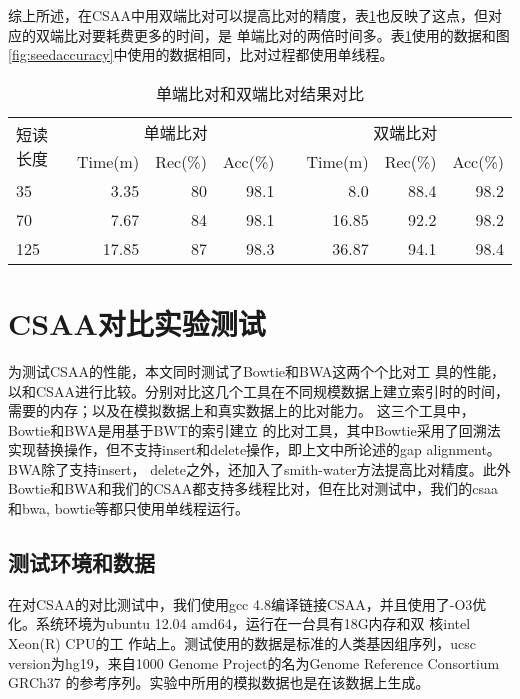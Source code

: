 综上所述，在CSAA中用双端比对可以提高比对的精度，表\ref{tab:alignmentaccuracy}也反映了这点，但对应的双端比对要耗费更多的时间，是
单端比对的两倍时间多。表\ref{tab:alignmentaccuracy}使用的数据和图\ref{fig:seedaccuracy}中使用的数据相同，比对过程都使用单线程。

\begin{table}[htbp]
    \caption{单端比对和双端比对结果对比}
    \label{tab:alignmentaccuracy}
    \centering
    \begin{tabular}{lrrrp{2ex}rrr}
        \toprule
        \multirow{2}{*}{短读长度} & \multicolumn{3}{c}{单端比对}& & \multicolumn{3}{c}{双端比对}\\
        \cline{2-4}
        \cline{6-8}
        &Time(m) &Rec(\%) &Acc(\%)& &Time(m) &Rec(\%) &Acc(\%)\\
        \midrule
        35 &3.35 &80 &98.1& &8.0 &88.4 &98.2 \\
        70 &7.67 &84 &98.1& &16.85 &92.2 &98.2 \\
        125 &17.85 &87 &98.3& &36.87 &94.1 &98.4 \\
        \bottomrule
    \end{tabular}
\end{table}



\section{CSAA对比实验测试}

为测试CSAA的性能，本文同时测试了Bowtie\cite{langmead2009ultrafast}和BWA\cite{li2009fast}这两个个比对工
具的性能，以和CSAA进行比较。分别对比这几个工具在不同规模数据上建立索引时的时间，需要的内存；以及在模拟数据上和真实数据上的比对能力。
这三个工具中，Bowtie和BWA是用基于BWT的索引建立
的比对工具，其中Bowtie采用了回溯法实现替换操作，但不支持insert和delete操作，即上文中所论述的gap alignment。BWA除了支持insert，
delete之外，还加入了smith-water方法提高比对精度。此外Bowtie和BWA和我们的CSAA都支持多线程比对，但在比对测试中，我们的csaa和bwa,
bowtie等都只使用单线程运行。

\subsection{测试环境和数据}

在对CSAA的对比测试中，我们使用gcc 4.8编译链接CSAA，并且使用了-O3优化。系统环境为ubuntu 12.04 amd64，运行在一台具有18G内存和双
核intel Xeon(R) CPU的工
作站上。测试使用的数据是标准的人类基因组序列，ucsc version为hg19，来自1000 Genome Project的名为Genome Reference Consortium GRCh37
的参考序列。实验中所用的模拟数据也是在该数据上生成。


